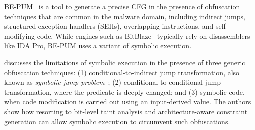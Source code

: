 BE-PUM~\cite{HOT-FPS15} is a tool to generate a precise CFG in the presence of obfuscation techniques that are common in the malware domain, including indirect jumps, structured exception handlers (SEHs), overlapping instructions, and self-modifying code. While engines such as {\sc BitBlaze}~\cite{BITBLAZE-ICISS08} typically rely on disassemblers like IDA Pro, BE-PUM uses a variant of symbolic execution.

\cite{YD-CCS15} discusses the limitations of symbolic execution in the presence of three generic obfuscation techniques: (1) conditional-to-indirect jump transformation, also known as {\em symbolic jump problem}~\cite{SAB-SP10}; (2) conditional-to-conditional jump transformation, where the predicate is deeply changed; and (3) symbolic code, when code modification is carried out using an input-derived value. The authors show how resorting to bit-level taint analysis and architecture-aware constraint generation can allow symbolic execution to circumvent such obfuscations.